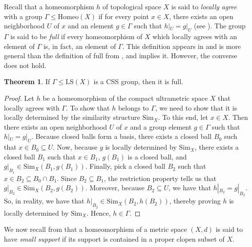 \documentclass[12pt]{amsart}
\numberwithin{equation}{subsection}
\theoremstyle{definition}
\newtheorem{theorem}{Theorem}[section]
\theoremstyle{definition}
\theoremstyle{remark}
\newcommand{\Sim}{\text{Sim}}
\begin{document}
Recall that a homeomorphism $h$ of topological space $X$ is said to \textit{locally agree} with a group $\Gamma \le \text{Homeo}(X)$ if for every point $x \in X$, there exists an open neighborhood $U$ of $x$ and an element $g \in \Gamma$ such that $h|_{U} = g|_{U}$ (see \cite{Olukoya2021}). The group $\Gamma$ is said to be \textit{full} if every homeomorphism of $X$ which locally agrees with an element of $\Gamma$ is, in fact, an element of $\Gamma$. This definition appears in \cite{Olukoya2021} and is more general than the definition of full from \cite{BleakEtAll2023}, and implies it. However, the converse does not hold. 

\begin{theorem}\label{thm:full}
If $\Gamma \leq \text{LS}(X)$ is a CSS group, then it is full.
\end{theorem}
\begin{proof}
Let $h$ be a homeomorphism of the compact ultrametric space $X$ that locally agrees with $\Gamma$. To show that $h$ belongs to $\Gamma$, we need to show that it is locally determined by the similarity structure $\Sim_{X}$. To this end, let $x \in X$. Then there exists an open neighborhood $U$ of $x$ and a group element $g \in \Gamma$ such that $h|_{U} = g|_{U}$. Because closed balls form a basis, there exists a closed ball $B_0$ such that $x \in B_0 \subseteq U$. Now, because $g$ is locally determined by $\Sim_{X}$, there exists a closed ball $B_1$ such that $x \in B_1$, $g(B_1)$ is a closed ball, and $g|_{B_1} \in \Sim_{X}(B_1,g(B_1))$. Finally, pick a closed ball $B_2$ such that $x \in B_2 \subseteq B_0 \cap B_1$. Since $B_2 \subseteq B_1$, the restriction property tells us that $g|_{B_2} \in \Sim_{X}(B_2,g(B_2))$. Moreover, because $B_2 \subseteq U$, we have that $h|_{B_2} = g|_{B_2}$. So, in reality, we have that $h|_{B_2} \in \Sim_{X}(B_2,h(B_2))$, thereby proving $h$ is locally determined by $\Sim_{X}$. Hence, $h \in \Gamma$. 
\end{proof}



We now recall from \cite{BleakEtAll2023} that a homeomorphism of a metric space $(X,d)$ is said to have \emph{small support} if its support is contained in a proper clopen subset of $X$.
\end{document}
